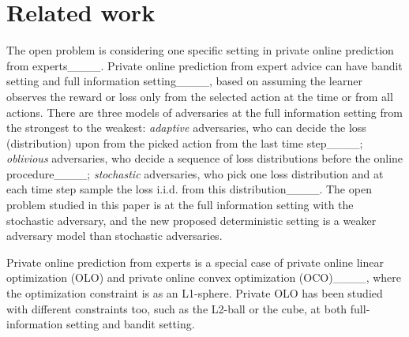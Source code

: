 \section{Related work}
The open problem is considering one specific setting in private online prediction from experts____.
Private online prediction from expert advice can have bandit setting and full information setting____, based on assuming the learner observes the reward or loss only from the selected action at the time or from all actions.
There are three models of adversaries at the full information setting from the strongest to the weakest: \textit{adaptive} adversaries, who can decide the loss (distribution) upon from the picked action from the last time step____; \textit{oblivious} adversaries, who decide a sequence of loss distributions before the online procedure____; \textit{stochastic} adversaries, who pick one loss distribution and at each time step sample the loss i.i.d. from this distribution____.
The open problem studied in this paper is at the full information setting with the stochastic adversary, and the new proposed deterministic setting is a weaker adversary model than stochastic adversaries.

Private online prediction from experts is a special case of private online linear optimization (OLO) and private online convex optimization (OCO)____, where the optimization constraint is as an L1-sphere.
Private OLO has been studied with different constraints too, such as the L2-ball or the cube, at both full-information setting and bandit setting.

%
